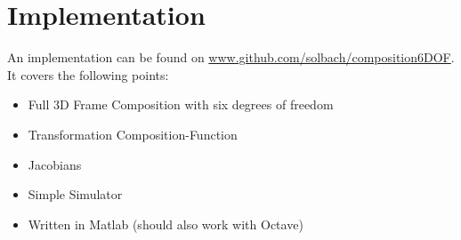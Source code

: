 \documentclass[10pt,a4paper]{scrartcl}
\begin{document}
\section{Implementation}
An implementation can be found on \href{https://github.com/solbach/composition6DOF}{www.github.com/solbach/composition6DOF}. \\It covers the following points:
\begin{itemize}
\item Full 3D Frame Composition with six degrees of freedom
\item Transformation Composition-Function
\item Jacobians
\item Simple Simulator
\item Written in Matlab (should also work with Octave)
\end{itemize}

\end{document}
